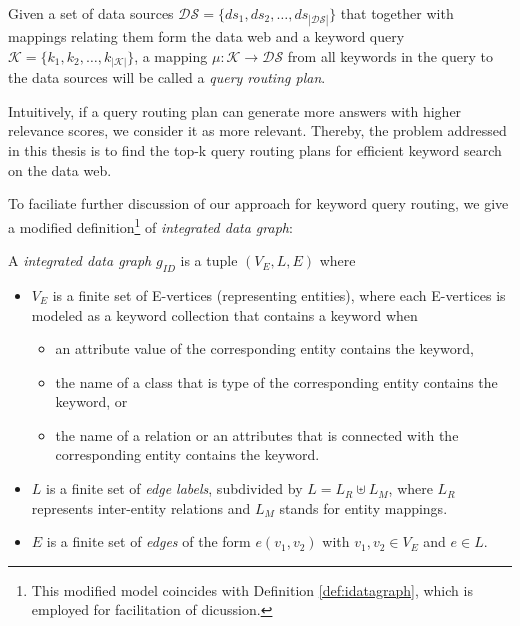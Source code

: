 \begin{definition}
Given a set of data sources $\mathcal{DS} =
\{ds_1,ds_2,\ldots,ds_{\left\vert\mathcal{DS}\right\vert}\}$ that together with mappings relating
them form the data web and a keyword query $\mathcal{K} =
\{k_1,k_2,\ldots,k_{\left\vert\mathcal{K}\right\vert}\}$, a mapping $\mu: \mathcal{K} \to
\mathcal{DS}$ from all keywords in the query to the data sources will be called a \emph{query
routing plan}.
\end{definition}

Intuitively, if a query routing plan can generate more answers with higher relevance scores, we
consider it as more relevant. Thereby, the problem addressed in this thesis is to find the top-k
query routing plans for efficient keyword search on the data web.

To faciliate further discussion of our approach for keyword query routing, we give a modified
definition\footnote{This modified model coincides with Definition \ref{def:idatagraph}, which is
employed for facilitation of dicussion.} of {\em integrated data graph}:

\begin{definition}\label{def:idatagraph2}
A \emph{integrated data graph} $g_{ID}$ is a tuple $(V_E,L,E)$ where
\begin{itemize}
  \item $V_E$ is a finite set of E-vertices (representing entities), where each E-vertices is
  modeled as a keyword collection that contains a keyword when
  \begin{itemize}
    \item an attribute value of the corresponding entity contains the keyword,
    \item the name of a class that is type of the corresponding entity contains the keyword, or
    \item the name of a relation or an attributes that is connected with the corresponding entity
    contains the keyword.
  \end{itemize}
  \item $L$ is a finite set of \emph{edge
  labels}, subdivided by $L = L_R \uplus L_M$, where $L_R$ represents
  inter-entity relations and $L_M$ stands for entity mappings.
  \item $E$ is a
  finite set of \emph{edges} of the form $e(v_1,v_2)$ with $v_1,v_2\in V_E$ and $e\in L$.
\end{itemize}
\end{definition}




